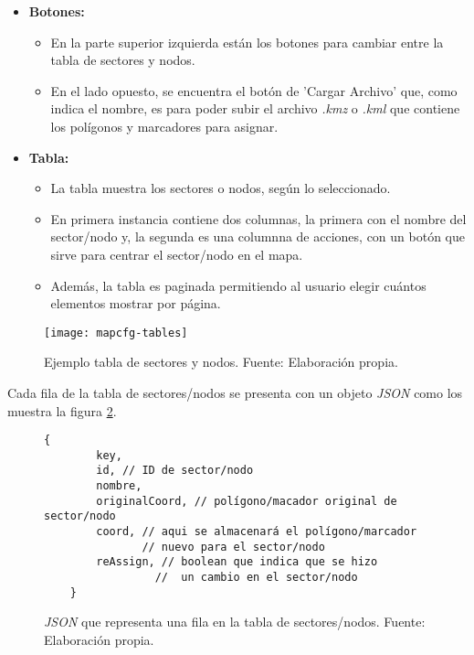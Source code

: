 \begin{itemize}
    \item \textbf{Botones:}
          \begin{itemize}
              \item En la parte superior izquierda están los botones para cambiar entre la tabla de sectores y nodos.
              \item En el lado opuesto, se encuentra el botón de 'Cargar Archivo' que, como indica el nombre, es para poder subir el archivo \textit{.kmz} o \textit{.kml} que contiene los polígonos y marcadores para asignar.
          \end{itemize}
    \item \textbf{Tabla:}  
    \begin{itemize}
        \item La tabla muestra los sectores o nodos, según lo seleccionado.
        \item En primera instancia contiene dos columnas, la primera con el nombre del sector/nodo y, la segunda es una columnna de acciones, con un botón que sirve para centrar el sector/nodo en el mapa. 
        \item Además, la tabla es paginada permitiendo al usuario elegir cuántos elementos mostrar por página.
    \end{itemize}
\end{itemize}

\begin{figure}[H]
	\centering
	\texttt{[image: mapcfg-tables]}
	\caption{\label{fig:mapcfg-tables-exameple} Ejemplo tabla de sectores y nodos. Fuente: Elaboración propia.}
\end{figure}

Cada fila de la tabla de sectores/nodos se presenta con un objeto \textit{JSON} como los muestra la figura \ref{fig:ejemplo-mapa-json}.
\begin{figure}[H]
    \centering
    \begin{lstlisting}[frame=single, basicstyle=\ttfamily\small]
    {
        key,
        id, // ID de sector/nodo
        nombre,
        originalCoord, // polígono/macador original de sector/nodo
        coord, // aqui se almacenará el polígono/marcador 
               // nuevo para el sector/nodo
        reAssign, // boolean que indica que se hizo 
                 //  un cambio en el sector/nodo
    }     
    \end{lstlisting}
    \caption{\textit{JSON} que representa una fila en la tabla de sectores/nodos. Fuente: Elaboración propia.}
    \label{fig:ejemplo-mapa-json}
\end{figure}

